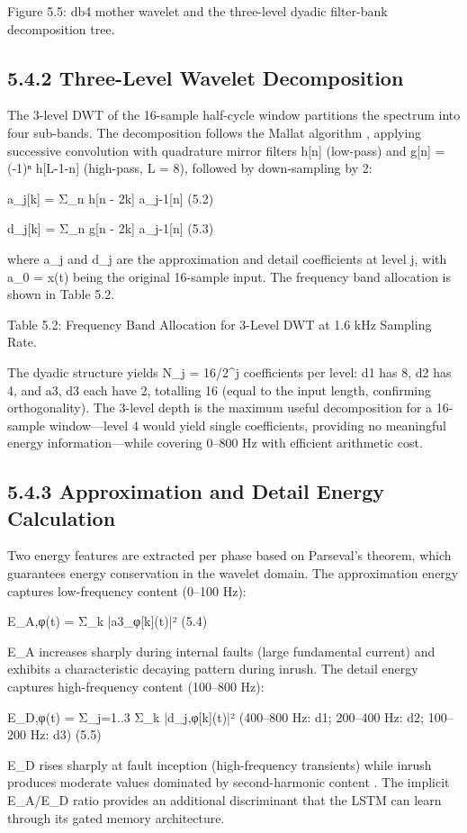 Figure 5.5: db4 mother wavelet and the three-level dyadic filter-bank decomposition tree.


\subsection{5.4.2  Three-Level Wavelet Decomposition}
The 3-level DWT of the 16-sample half-cycle window partitions the spectrum into four sub-bands. The decomposition follows the Mallat algorithm \cite{ref5}, applying successive convolution with quadrature mirror filters h[n] (low-pass) and g[n] = (-1)ⁿ h[L-1-n] (high-pass, L = 8), followed by down-sampling by 2:

a\_j[k] = Σ\_n h[n - 2k] a\_{j-1}[n]	(5.2)

d\_j[k] = Σ\_n g[n - 2k] a\_{j-1}[n]	(5.3)

where a\_j and d\_j are the approximation and detail coefficients at level j, with a\_0 = x(t) being the original 16-sample input. The frequency band allocation is shown in Table 5.2.

Table 5.2: Frequency Band Allocation for 3-Level DWT at 1.6 kHz Sampling Rate.

The dyadic structure yields N\_j = 16/2^j coefficients per level: d1 has 8, d2 has 4, and a3, d3 each have 2, totalling 16 (equal to the input length, confirming orthogonality). The 3-level depth is the maximum useful decomposition for a 16-sample window---level 4 would yield single coefficients, providing no meaningful energy information---while covering 0--800 Hz with efficient arithmetic cost.


\subsection{5.4.3  Approximation and Detail Energy Calculation}
Two energy features are extracted per phase based on Parseval's theorem, which guarantees energy conservation in the wavelet domain. The approximation energy captures low-frequency content (0--100 Hz):

E\_A,φ(t) = Σ\_k |a3\_φ[k](t)|²	(5.4)

E\_A increases sharply during internal faults (large fundamental current) and exhibits a characteristic decaying pattern during inrush. The detail energy captures high-frequency content (100--800 Hz):

E\_D,φ(t) = Σ\_{j=1..3} Σ\_k |d\_j,φ[k](t)|²  (400--800 Hz: d1; 200--400 Hz: d2; 100--200 Hz: d3)	(5.5)

E\_D rises sharply at fault inception (high-frequency transients) while inrush produces moderate values dominated by second-harmonic content \cite{ref24, ref30}. The implicit E\_A/E\_D ratio provides an additional discriminant that the LSTM can learn through its gated memory architecture.


